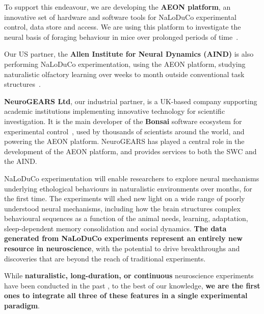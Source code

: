 To support this endeavour, we are developing the \textbf{AEON platform}, an
innovative set of hardware and software tools for NaLoDuCo experimental
control, data store and access. We are using this platform to investigate the
neural basis of foraging behaviour in mice over prolonged periods of
time~\citep{campagnerEtAl24}.

Our US partner, the \textbf{Allen Institute for Neural Dynamics (AIND)} is also
performing NaLoDuCo experimentation, using the AEON platform, studying
naturalistic olfactory learning over weeks to month outside conventional task
structures~\citep{finkEtAl24}.

\textbf{NeuroGEARS Ltd}, our industrial partner, is a UK-based company
supporting academic institutions implementing innovative technology for
scientific investigation.
%
It is the main developer of the \textbf{Bonsai} software ecosystem for
experimental control~\citep{lopesEtAl15}, used by thousands of scientists
around the world, and powering the AEON platform.
%
NeuroGEARS  has played a central role in the development of the AEON platform,
and provides services to both the SWC and the AIND.

NaLoDuCo experimentation will enable researchers to explore neural mechanisms
underlying ethological behaviours in naturalistic environments over months, for
the first time.  The experiments will shed new light on a wide range of poorly
understood neural mechanisms, including how the brain structures complex
behavioural sequences as a function of the animal needs, learning, adaptation,
sleep-dependent memory consolidation and social dynamics.
%
\textbf{The data generated from NaLoDuCo experiments represent an entirely new
resource in neuroscience}, with the potential to drive breakthroughs and
discoveries that are beyond the reach of traditional experiments.


While \textbf{naturalistic, long-duration, or continuous} neuroscience experiments have
been conducted in the past
\citep{nagyEtAl23,hoEtAl23,rayEtAl25,weissbrodEtAl13,dhawaleEtAl17,newmanEtAl24}, to the
best of our knowledge, \textbf{we are the first ones to integrate all three of these
features in a single experimental paradigm}.
%

